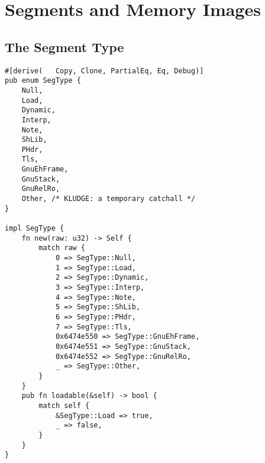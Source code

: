 \documentclass[11pt]{article}
\begin{document}
\section{Segments and Memory Images}
\label{sec:orge7fb301}

\subsection{The Segment Type}
\label{sec:org729c3d2}

\lstset{language=rust,label=org0e39133,caption= ,captionpos=b,numbers=none}
\begin{lstlisting}
#[derive(   Copy, Clone, PartialEq, Eq, Debug)]
pub enum SegType {
    Null,
    Load,
    Dynamic,
    Interp,
    Note,
    ShLib,
    PHdr,
    Tls,
    GnuEhFrame,
    GnuStack,
    GnuRelRo,
    Other, /* KLUDGE: a temporary catchall */
}

impl SegType {
    fn new(raw: u32) -> Self {
        match raw {
            0 => SegType::Null,
            1 => SegType::Load,
            2 => SegType::Dynamic,
            3 => SegType::Interp,
            4 => SegType::Note,
            5 => SegType::ShLib,
            6 => SegType::PHdr,
            7 => SegType::Tls,
            0x6474e550 => SegType::GnuEhFrame,
            0x6474e551 => SegType::GnuStack,
            0x6474e552 => SegType::GnuRelRo,
            _ => SegType::Other,
        }
    }
    pub fn loadable(&self) -> bool {
        match self {
            &SegType::Load => true,
            _ => false,
        }
    }
}
\end{lstlisting}
\end{document}

